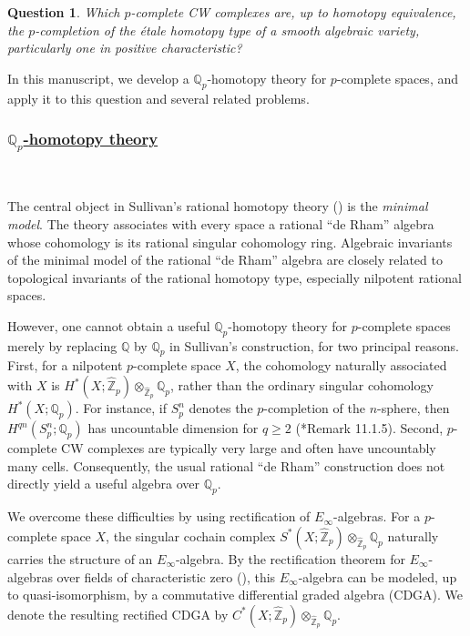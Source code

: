 \documentclass[11pt]{amsart}
\newtheorem{question}[theorem]{Question}
\theoremstyle{definition}
\numberwithin{equation}{section}
\numberwithin{equation}{section}
\newcommand\QQ{\mathbb{Q}}
\newcommand\ZZ{\mathbb{Z}}
\begin{document}
\begin{question}\label{Question: main question}
Which $p$-complete CW complexes are, up to homotopy equivalence, the $p$-completion of the \'etale homotopy type of a smooth algebraic variety, particularly one in positive characteristic?    
\end{question}

In this manuscript, we develop a $\QQ_p$-homotopy theory for $p$-complete spaces, and apply it to this question and several related problems. 

\subsubsection*{\underline{$\QQ_p$-homotopy theory}}\,

The central object in Sullivan's rational homotopy theory (\cite{Sullivan-rational-homotopy}) is the \textit{minimal model}. The theory
associates with every space a rational ``de Rham'' algebra whose cohomology is its rational singular cohomology ring. Algebraic invariants of the minimal model of the rational ``de Rham'' algebra are closely related to
topological invariants of the rational homotopy type, especially nilpotent rational spaces.

However, one cannot obtain a useful $\QQ_p$-homotopy theory for $p$-complete spaces merely by replacing $\QQ$ by $\QQ_p$ in Sullivan's construction, for two principal reasons. First, for a nilpotent $p$-complete space $X$, the cohomology naturally associated with $X$ is $H^*(X;\widehat{\ZZ}_{p})\otimes_{\widehat{\ZZ}_p}\QQ_p$, rather than the ordinary singular cohomology $H^*(X;\QQ_p)$. For instance, if $S^n_{p}$ denotes the $p$-completion of the $n$-sphere, then $H^{qn}(S^n_{p};\QQ_p)$ has uncountable dimension for $q\geq 2$ (\cite{more-concise}*{Remark 11.1.5}). Second, $p$-complete CW complexes are typically very large and often have uncountably many cells. Consequently, the usual rational ``de Rham'' construction does not directly yield a useful algebra over $\QQ_p$.

We overcome these difficulties by using rectification of $E_{\infty}$-algebras. For a $p$-complete space $X$, the singular cochain complex $S^*(X;\widehat{\ZZ}_p)\otimes_{\widehat{\ZZ}_p}\QQ_p$ naturally carries the structure of an $E_{\infty}$-algebra. By the
rectification theorem for $E_\infty$-algebras over fields of characteristic zero (\cite{Hinich-Model-Structure-on-homotopy-algbras}\cite{White-E-infinity-algebra-characteristic-zero}),
this $E_\infty$-algebra can be modeled, up to quasi-isomorphism, by a
commutative differential graded algebra (CDGA). We denote the resulting rectified CDGA by $C^*(X;\widehat{\ZZ}_p)\otimes_{\widehat{\ZZ}_p}\QQ_p$. 
\end{document}
